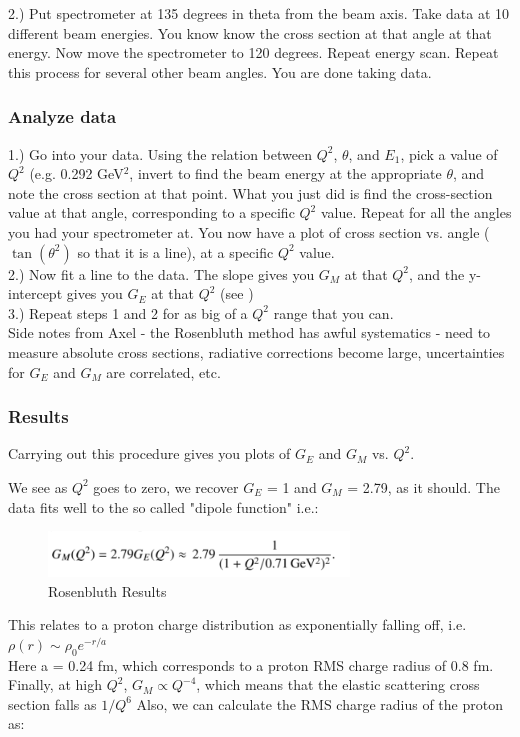                 2.) Put spectrometer at 135 degrees in theta from the beam axis. Take data at 10 different beam energies. You know know the cross section at that angle at that energy. Now move the spectrometer to 120 degrees. Repeat energy scan. Repeat this process for several other beam angles. You are done taking data.
            \subsubsection{Analyze data}
                1.) Go into your data. Using the relation between $Q^2$, $\theta$, and $E_1$, pick a value of $Q^2$ (e.g. 0.292 GeV$^2$, invert to find the beam energy at the appropriate $\theta$, and note the cross section at that point. What you just did is find the cross-section value at that angle, corresponding to a specific $Q^2$ value. Repeat for all the angles you had your spectrometer at. You now have a plot of cross section vs. angle ($\tan(\theta^2)$ so that it is a line), at a specific $Q^2$ value. \\
                2.) Now fit a line to the data. The slope gives you $G_M$ at that $Q^2$, and the y-intercept gives you $G_E$ at that $Q^2$ (see \label{eq:1})\\
                3.) Repeat steps 1 and 2 for as big of a $Q^2$ range that you can. \\
                \newline
                Side notes from Axel - the Rosenbluth method has awful systematics - need to measure absolute cross sections, radiative corrections become large, uncertainties for $G_E$ and $G_M$ are correlated, etc.
            \subsubsection{Results}
                Carrying out this procedure gives you plots of $G_E$ and $G_M$ vs. $Q^2$. 
                
                We see as $Q^2$ goes to zero, we recover $G_E$ = 1 and $G_M$ = 2.79, as it should. The data fits well to the so called "dipole function" i.e.:
                \begin{figure}[H]
                    \centering
                    \includegraphics[width=8cm]{NuclearPhysics/modules/lepton-scattering/pics/elastic-ep/dipole.PNG}
                    \caption{Rosenbluth Results}
                \end{figure}
                This relates to a proton charge distribution as exponentially falling off, i.e.\\
                $\rho(r) \sim \rho_0 e^{-r/a}$\\
                Here a = 0.24 fm, which corresponds to a proton RMS charge radius of 0.8 fm. \\
                Finally, at high $Q^2$, $G_M \propto Q^{-4}$, which means that the elastic scattering cross section falls as $1/Q^6$
                Also, we can calculate the RMS charge radius of the proton as:
                
